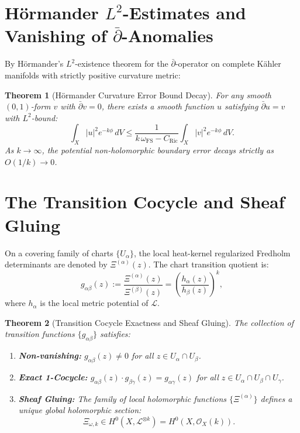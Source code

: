 \documentclass[11pt,a4paper]{article}
\newtheorem{theorem}{Theorem}[section]
\theoremstyle{definition}
\begin{document}
\section{H\"ormander $L^2$-Estimates and Vanishing of $\bar{\partial}$-Anomalies}

By H\"ormander's $L^2$-existence theorem for the $\bar{\partial}$-operator on complete K\"ahler manifolds with strictly positive curvature metric:
\begin{theorem}[H\"ormander Curvature Error Bound Decay]
For any smooth $(0,1)$-form $v$ with $\bar{\partial} v = 0$, there exists a smooth function $u$ satisfying $\bar{\partial} u = v$ with $L^2$-bound:
\begin{equation}
  \int_X |u|^2 e^{-k \phi} \, dV \le \frac{1}{k\,\omega_{\mathrm{FS}} - C_{\mathrm{Ric}}} \int_X |v|^2 e^{-k \phi} \, dV.
\end{equation}
As $k \to \infty$, the potential non-holomorphic boundary error decays strictly as $O(1/k) \to 0$.
\end{theorem}

\section{The Transition Cocycle and Sheaf Gluing}

On a covering family of charts $\{U_\alpha\}$, the local heat-kernel regularized Fredholm determinants are denoted by $\Xi^{(\alpha)}(z)$. The chart transition quotient is:
\begin{equation}
  g_{\alpha\beta}(z) := \frac{\Xi^{(\alpha)}(z)}{\Xi^{(\beta)}(z)} = \left( \frac{h_\alpha(z)}{h_\beta(z)} \right)^k,
\end{equation}
where $h_\alpha$ is the local metric potential of $\mathcal{L}$.

\begin{theorem}[Transition Cocycle Exactness and Sheaf Gluing]
The collection of transition functions $\{g_{\alpha\beta}\}$ satisfies:
\begin{enumerate}
  \item \textbf{Non-vanishing:} $g_{\alpha\beta}(z) \neq 0$ for all $z \in U_\alpha \cap U_\beta$.
  \item \textbf{Exact 1-Cocycle:} $g_{\alpha\beta}(z) \cdot g_{\beta\gamma}(z) = g_{\alpha\gamma}(z)$ for all $z \in U_\alpha \cap U_\beta \cap U_\gamma$.
  \item \textbf{Sheaf Gluing:} The family of local holomorphic functions $\{\Xi^{(\alpha)}\}$ defines a unique global holomorphic section:
  \begin{equation}
    \Xi_{\omega, k} \in H^0(X, \mathcal{L}^{\otimes k}) = H^0(X, \mathcal{O}_X(k)).
  \end{equation}
\end{enumerate}
\end{theorem}
\end{document}
